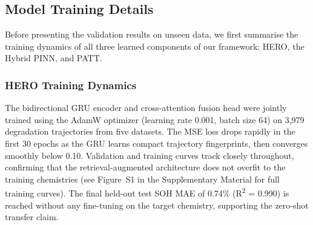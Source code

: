\documentclass[5p,times,authoryear]{elsarticle}
\begin{document}
\begin{table}[!htb]
\caption{Summary of Datasets Used Across Framework Components}
\begin{center}
\end{center}
\label{tab:datasets}
\end{table}

\subsection{Model Training Details}

Before presenting the validation results on unseen data, we first summarise the training dynamics of all three learned components of our framework: HERO, the Hybrid PINN, and PATT.

\subsubsection{HERO Training Dynamics}

The bidirectional GRU encoder and cross-attention fusion head were jointly trained using the AdamW optimizer (learning rate 0.001, batch size 64) on 3,979 degradation trajectories from five datasets. The MSE loss drops rapidly in the first 30 epochs as the GRU learns compact trajectory fingerprints, then converges smoothly below 0.10. Validation and training curves track closely throughout, confirming that the retrieval-augmented architecture does not overfit to the training chemistries (see Figure~S1 in the Supplementary Material for full training curves). The final held-out test SOH MAE of 0.74\% (R\textsuperscript{2} = 0.990) is reached without any fine-tuning on the target chemistry, supporting the zero-shot transfer claim.
\end{document}
